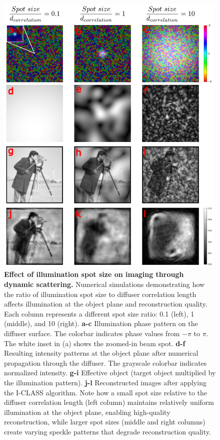 \documentclass[pdflatex,sn-mathphys-num,Numbered]{sn-jnl}%
\theoremstyle{thmstyleone}%
\theoremstyle{thmstyletwo}%
\theoremstyle{thmstylethree}%
\begin{document}
\begin{figure}
	\centering
	\includegraphics[width=0.99\textwidth]{supp_figures/figure_S7.pdf}
    \caption{\textbf{Effect of illumination spot size on imaging through dynamic scattering.} Numerical simulations demonstrating how the ratio of illumination spot size to diffuser correlation length affects illumination at the object plane and reconstruction quality. Each column represents a different spot size ratio: 0.1 (left), 1 (middle), and 10 (right). \textbf{a-c} Illumination phase pattern on the diffuser surface. The colorbar indicates phase values from $-\pi$ to $\pi$. The white inset in (a) shows the zoomed-in beam spot. \textbf{d-f} Resulting intensity patterns at the object plane after numerical propagation through the diffuser. The grayscale colorbar indicates normalized intensity. \textbf{g-i} Effective object (target object multiplied by the illumination pattern). \textbf{j-l} Reconstructed images after applying the I-CLASS algorithm. Note how a small spot size relative to the diffuser correlation length (left column) maintains relatively uniform illumination at the object plane, enabling high-quality reconstruction, while larger spot sizes (middle and right columns) create varying speckle patterns that degrade reconstruction quality.}
    \label{fig:spot_size}
\end{figure}
\end{document}
